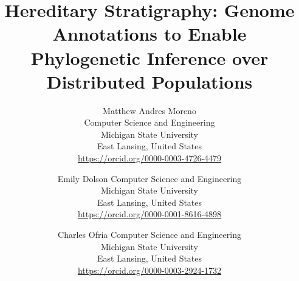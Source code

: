 \title{ Hereditary Stratigraphy: Genome Annotations to Enable Phylogenetic Inference over Distributed Populations }

\author{
Matthew Andres Moreno\\
Computer Science and Engineering \\
Michigan State University\\
East Lansing, United States \\
\url{https://orcid.org/0000-0003-4726-4479} \\
\and
Emily Dolson
Computer Science and Engineering \\
Michigan State University\\
East Lansing, United States \\
\url{https://orcid.org/0000-0001-8616-4898}
\and
Charles Ofria
Computer Science and Engineering \\
Michigan State University\\
East Lansing, United States \\
\url{https://orcid.org/0000-0003-2924-1732}
}

\maketitle
